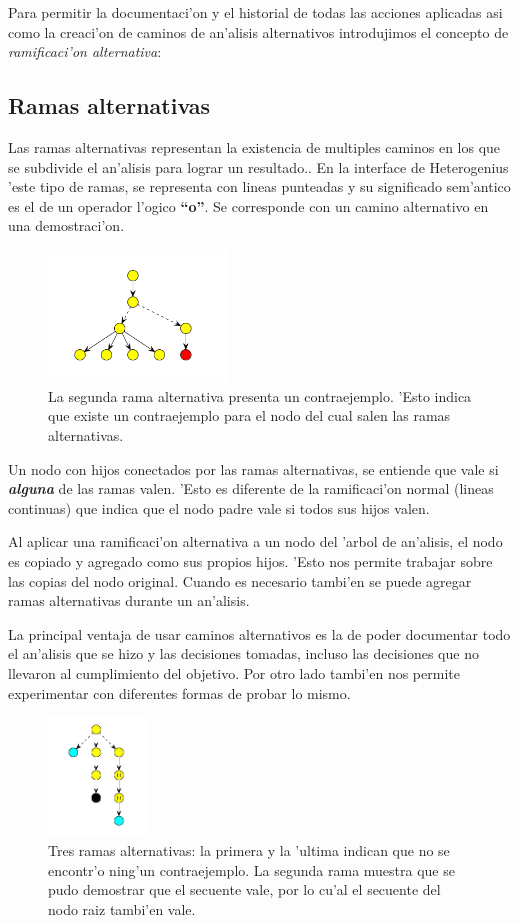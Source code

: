 Para permitir la documentaci'on y el historial de todas las acciones aplicadas asi como la creaci'on de caminos de an'alisis alternativos introdujimos el concepto de \textit{ramificaci'on alternativa}:


\subsection{Ramas alternativas}

Las ramas alternativas representan la existencia de multiples caminos en los que se subdivide el an'alisis para lograr un resultado.. En la interface de Heterogenius 'este tipo de ramas, se representa con lineas punteadas y su significado sem'antico es el de un operador l'ogico \textbf{``o''}. Se corresponde con un camino alternativo en una demostraci'on.

\begin{figure}[H]
	\includegraphics[width=180px]{img/ramas_alternativas_2.png}
	\centering
	\caption{La segunda rama alternativa presenta un contraejemplo. 'Esto indica que existe un contraejemplo para el nodo del cual salen las ramas alternativas.}
\end{figure}

Un nodo con hijos conectados por las ramas alternativas, se entiende que vale si \textit{\textbf{alguna}} de las ramas valen. 'Esto es diferente de la ramificaci'on normal (lineas continuas) que indica que el nodo padre vale si todos sus hijos valen.

Al aplicar una ramificaci'on alternativa a un nodo del 'arbol de an'alisis, el nodo es copiado y agregado como sus propios hijos. 'Esto nos permite trabajar sobre las copias del nodo original. Cuando es necesario tambi'en se puede agregar ramas alternativas durante un an'alisis.
 
La principal ventaja de usar caminos alternativos es la de poder documentar todo el an'alisis que se hizo y las decisiones tomadas, incluso las decisiones que no llevaron al cumplimiento del objetivo. Por otro lado tambi'en nos permite experimentar con diferentes formas de probar lo mismo.

\begin{figure}[H]
	\includegraphics[width=100px]{img/ramas_alternativas.png}
	\centering
	\caption{Tres ramas alternativas: la primera y la 'ultima indican que no se encontr'o ning'un contraejemplo. La segunda rama muestra que se pudo demostrar que el secuente vale, por lo cu'al el secuente del nodo raiz tambi'en vale.}
\end{figure}


